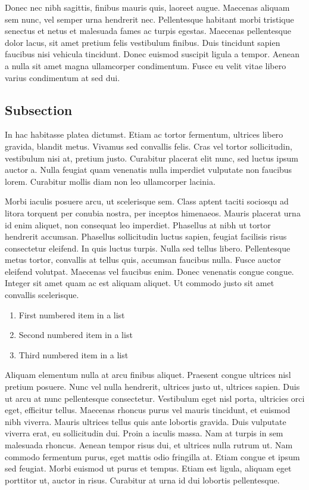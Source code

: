 \documentclass[10pt, a4paper]{article} %
\begin{document}
Donec nec nibh sagittis, finibus mauris quis, laoreet augue. Maecenas aliquam sem nunc, vel semper urna hendrerit nec. Pellentesque habitant morbi tristique senectus et netus et malesuada fames ac turpis egestas. Maecenas pellentesque dolor lacus, sit amet pretium felis vestibulum finibus. Duis tincidunt sapien faucibus nisi vehicula tincidunt. Donec euismod suscipit ligula a tempor. Aenean a nulla sit amet magna ullamcorper condimentum. Fusce eu velit vitae libero varius condimentum at sed dui.


\subsection{Subsection}

In hac habitasse platea dictumst. Etiam ac tortor fermentum, ultrices libero gravida, blandit metus. Vivamus sed convallis felis. Cras vel tortor sollicitudin, vestibulum nisi at, pretium justo. Curabitur placerat elit nunc, sed luctus ipsum auctor a. Nulla feugiat quam venenatis nulla imperdiet vulputate non faucibus lorem. Curabitur mollis diam non leo ullamcorper lacinia.

Morbi iaculis posuere arcu, ut scelerisque sem. Class aptent taciti sociosqu ad litora torquent per conubia nostra, per inceptos himenaeos. Mauris placerat urna id enim aliquet, non consequat leo imperdiet. Phasellus at nibh ut tortor hendrerit accumsan. Phasellus sollicitudin luctus sapien, feugiat facilisis risus consectetur eleifend. In quis luctus turpis. Nulla sed tellus libero. Pellentesque metus tortor, convallis at tellus quis, accumsan faucibus nulla. Fusce auctor eleifend volutpat. Maecenas vel faucibus enim. Donec venenatis congue congue. Integer sit amet quam ac est aliquam aliquet. Ut commodo justo sit amet convallis scelerisque.

\begin{enumerate}
	\item First numbered item in a list
	\item Second numbered item in a list
	\item Third numbered item in a list
\end{enumerate}

Aliquam elementum nulla at arcu finibus aliquet. Praesent congue ultrices nisl pretium posuere. Nunc vel nulla hendrerit, ultrices justo ut, ultrices sapien. Duis ut arcu at nunc pellentesque consectetur. Vestibulum eget nisl porta, ultricies orci eget, efficitur tellus. Maecenas rhoncus purus vel mauris tincidunt, et euismod nibh viverra. Mauris ultrices tellus quis ante lobortis gravida. Duis vulputate viverra erat, eu sollicitudin dui. Proin a iaculis massa. Nam at turpis in sem malesuada rhoncus. Aenean tempor risus dui, et ultrices nulla rutrum ut. Nam commodo fermentum purus, eget mattis odio fringilla at. Etiam congue et ipsum sed feugiat. Morbi euismod ut purus et tempus. Etiam est ligula, aliquam eget porttitor ut, auctor in risus. Curabitur at urna id dui lobortis pellentesque.
\end{document}
